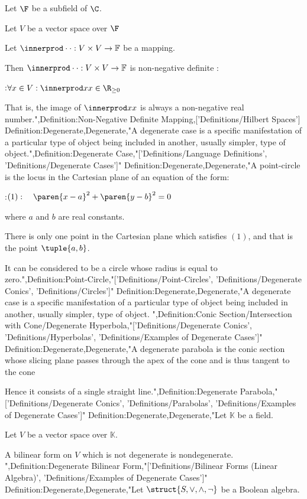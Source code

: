 Let $\F$ be a subfield of $\C$.

Let $V$ be a vector space over $\F$

Let $\innerprod \cdot \cdot: V \times V \to \mathbb F$ be a mapping.


Then $\innerprod \cdot \cdot: V \times V \to \mathbb F$ is non-negative definite :

:$\forall x \in V: \innerprod x x \in \R_{\ge 0}$


That is, the image of $\innerprod x x$ is always a non-negative real number.",Definition:Non-Negative Definite Mapping,['Definitions/Hilbert Spaces']
Definition:Degenerate,Degenerate,"A degenerate case is a specific manifestation of a particular type of object being included in another, usually simpler, type of object.",Definition:Degenerate Case,"['Definitions/Language Definitions', 'Definitions/Degenerate Cases']"
Definition:Degenerate,Degenerate,"A point-circle is the locus in the Cartesian plane of an equation of the form:

:$(1): \quad \paren {x - a}^2 + \paren {y - b}^2 = 0$

where $a$ and $b$ are real constants.


There is only one point in the Cartesian plane which satisfies $(1)$, and that is the point $\tuple {a, b}$.

It can be considered to be a circle whose radius is equal to zero.",Definition:Point-Circle,"['Definitions/Point-Circles', 'Definitions/Degenerate Conics', 'Definitions/Circles']"
Definition:Degenerate,Degenerate,"A degenerate case is a specific manifestation of a particular type of object being included in another, usually simpler, type of object.
",Definition:Conic Section/Intersection with Cone/Degenerate Hyperbola,"['Definitions/Degenerate Conics', 'Definitions/Hyperbolas', 'Definitions/Examples of Degenerate Cases']"
Definition:Degenerate,Degenerate,"A degenerate parabola is the conic section whose slicing plane passes through the apex of the cone and is thus tangent to the cone

Hence it consists of a single straight line.",Definition:Degenerate Parabola,"['Definitions/Degenerate Conics', 'Definitions/Parabolas', 'Definitions/Examples of Degenerate Cases']"
Definition:Degenerate,Degenerate,"Let $\mathbb K$ be a field.

Let $V$ be a vector space over $\mathbb K$.


A bilinear form on $V$ which is not degenerate is nondegenerate.
",Definition:Degenerate Bilinear Form,"['Definitions/Bilinear Forms (Linear Algebra)', 'Definitions/Examples of Degenerate Cases']"
Definition:Degenerate,Degenerate,"Let $\struct {S, \vee, \wedge, \neg}$ be a Boolean algebra.


